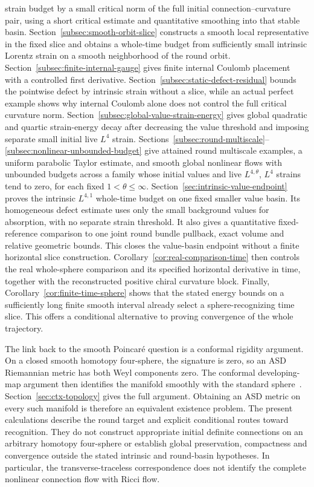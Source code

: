 \documentclass[11pt]{article}
\numberwithin{equation}{section}
\theoremstyle{definition}
\theoremstyle{remark}
\begin{document}
strain budget by a small critical norm of the full initial
connection--curvature pair, using a short critical estimate
and quantitative smoothing into that stable basin.
Section~\ref{subsec:smooth-orbit-slice} constructs a smooth
local representative in the fixed slice and obtains a whole-time
budget from sufficiently small intrinsic Lorentz strain on a smooth
neighborhood of the round orbit.
Section~\ref{subsec:finite-internal-gauge} gives finite internal
Coulomb placement with a controlled first derivative.
Section~\ref{subsec:static-defect-residual} bounds the pointwise
defect by intrinsic strain without a slice, while an actual
perfect example shows why internal Coulomb alone does not
control the full critical curvature norm.
Section~\ref{subsec:global-value-strain-energy} gives global
quadratic and quartic strain-energy decay after decreasing
the value threshold and imposing separate small initial
live \(L^4\) strain.
Sections~\ref{subsec:round-multiscale}--\ref{subsec:nonlinear-unbounded-budget}
give attained round multiscale examples, a uniform parabolic
Taylor estimate, and smooth global nonlinear flows with
unbounded budgets across a family whose initial values and
live \(L^{4,\theta}\), \(L^4\) strains tend to zero,
for each fixed \(1<\theta\le\infty\).
Section~\ref{sec:intrinsic-value-endpoint} proves the intrinsic
$L^{4,1}$ whole-time budget on one fixed smaller value basin.
Its homogeneous defect estimate uses only the small background
values for absorption, with no separate strain threshold.
It also gives a quantitative fixed-reference comparison to one
joint round bundle pullback, exact volume and relative geometric
bounds. This closes the value-basin endpoint without a finite
horizontal slice construction. Corollary~\ref{cor:real-comparison-time}
then controls the real whole-sphere comparison and its specified
horizontal derivative in time, together with the reconstructed
positive chiral curvature block.
Finally, Corollary~\ref{cor:finite-time-sphere} shows that the stated
energy bounds on a sufficiently long finite smooth interval already
select a sphere-recognizing time slice. This offers a conditional
alternative to proving convergence of the whole trajectory.

The link back to the smooth Poincar\'e question is a conformal rigidity
argument. On a closed smooth homotopy four-sphere, the signature is zero, so an ASD
Riemannian metric has both Weyl components zero. The conformal
developing-map argument then identifies the manifold smoothly with the
standard sphere~\cite{Kuiper1949}. Section~\ref{sec:ctx-topology} gives
the full argument. Obtaining an ASD metric on every such manifold is
therefore an equivalent existence problem. The present calculations describe
the round target and explicit conditional routes toward recognition.
They do not construct appropriate
initial definite connections on an arbitrary homotopy four-sphere or
establish global preservation, compactness and convergence outside the
stated intrinsic and round-basin hypotheses. In particular, the transverse-traceless correspondence
does not identify the complete nonlinear connection flow with Ricci flow.
\end{document}
